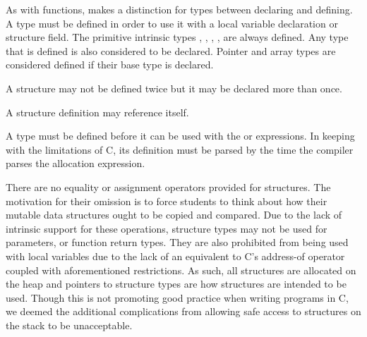 \grammarbegin
{}






\grammarend

As with functions, \langname{} makes a distinction for types between declaring
and defining.  A type must be defined in order to use it with a local variable
declaration or structure field. The primitive intrinsic types ,
, , ,  are always
defined. Any type that is defined is also considered to be declared. Pointer
and array types are considered defined if their base type is declared.

A structure may not be defined twice but it may be declared more than once.

A structure definition may reference itself.

A type must be defined before it can be used with the  or
 expressions.  In keeping with the limitations of C, its
definition must be parsed by the time the compiler parses the allocation
expression.

There are no equality or assignment operators provided for structures. The
motivation for their omission is to force students to think about how their
mutable data structures ought to be copied and compared. Due to the lack of
intrinsic support for these operations, structure types may not be used for
parameters, or function return types. They are also prohibited from being used
with local variables due to the lack of an equivalent to C's address-of operator
coupled with aforementioned restrictions. As such, all structures are allocated
on the heap and pointers to structure types are how structures are intended to
be used. Though this is not promoting good practice when writing programs in C,
we deemed the additional complications from allowing safe access to structures
on the stack to be unacceptable.

